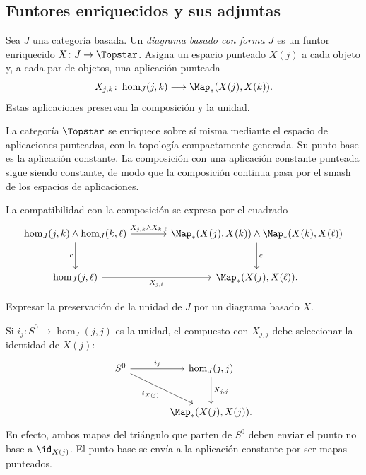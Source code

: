 \subsection{Funtores enriquecidos y sus adjuntas}

\begin{defi}\label{defi:c26-diagrama-basado}
Sea $J$ una categoría basada. Un \emph{diagrama basado con forma $J$} es un funtor enriquecido $X\colon J\to\Topstar$. Asigna un espacio punteado $X(j)$ a cada objeto y, a cada par de objetos, una aplicación punteada
\[
X_{j,k}\colon\hom_J(j,k)\longrightarrow\Map_*(X(j),X(k)).
\]
Estas aplicaciones preservan la composición y la unidad.
\end{defi}

La categoría $\Topstar$ se enriquece sobre sí misma mediante el espacio de aplicaciones punteadas, con la topología compactamente generada. Su punto base es la aplicación constante. La composición con una aplicación constante punteada sigue siendo constante, de modo que la composición continua pasa por el smash de los espacios de aplicaciones.

La compatibilidad con la composición se expresa por el cuadrado
\[
\begin{tikzcd}[column sep=large,row sep=large]
\hom_J(j,k)\wedge\hom_J(k,\ell)
\arrow[r,"X_{j,k}\wedge X_{k,\ell}"]\arrow[d,"c"']&
\Map_*(X(j),X(k))\wedge\Map_*(X(k),X(\ell))
\arrow[d,"c"]\\
\hom_J(j,\ell)\arrow[r,"X_{j,\ell}"']&\Map_*(X(j),X(\ell)).
\end{tikzcd}
\]

\begin{ejer}\label{ejer:c26-unidad-diagrama}
Expresar la preservación de la unidad de $J$ por un diagrama basado $X$.
\end{ejer}
\begin{sol}
Si $i_j\colon S^0\to \hom_J(j,j)$ es la unidad, el compuesto con $X_{j,j}$ debe seleccionar la identidad de $X(j)$:
\[
\begin{tikzcd}[column sep=large,row sep=large]
S^0\arrow[r,"i_j"]\arrow[dr,"i_{X(j)}"']&
\hom_J(j,j)\arrow[d,"X_{j,j}"]\\
&\Map_*(X(j),X(j)).
\end{tikzcd}
\]
En efecto, ambos mapas del triángulo que parten de $S^0$ deben enviar el punto no base a $\id_{X(j)}$. El punto base se envía a la aplicación constante por ser mapas punteados.
\end{sol}

